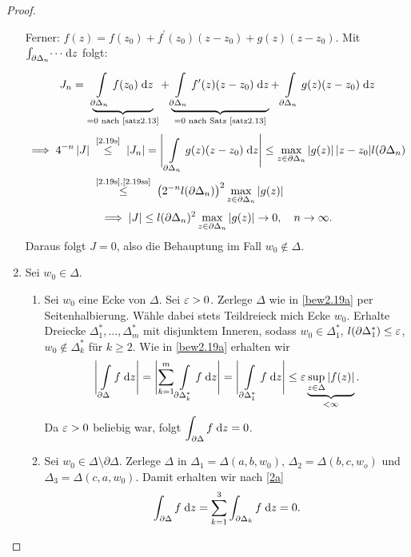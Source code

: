 \documentclass[a4paper,twoside,DIV15,BCOR12mm]{scrbook}
\begin{document}
\begin{proof}
\begin{enumerate}[label=(\arabic*),ref=(\arabic*)]
Ferner: $f(z)=f(z_0) + f^\prime(z_0)(z-z_0) + g(z)(z-z_0)$. Mit $\int_{\partial\Delta_n}^{}{\dotsi}\;\mathrm{d} z$ folgt:
\[ J_n = \underbrace{\int\limits_{\partial\Delta_n}^{}{f(z_0)}\;\mathrm{d}z}_{=0 \text{ nach \ref{satz2.13}}} +
\underbrace{\int\limits_{\partial\Delta_n}^{}{f^\prime(z)(z-z_0)}\;\mathrm{d}z}_{=0 \text{ nach Satz \ref{satz2.13}}} + \int\limits_{\partial\Delta_n}^{}{g(z)(z-z_0)}\;\mathrm{d}z \]
\begin{align*}
  \folgt 4^{-n}\abs{J} &\nach{\le}{\eqref{2.19s}} \abs{J_n} = \Biggl\lvert\,\Integral{\partial\Delta_n}{}{g(z)(z-z_0)}{z}\Biggr\rvert \le
  \max_{z\in\partial\Delta_n}{\abs{g(z)}\abs{z-z_0}}l(\partial\Delta_n) \\
  &\nach{\le}{\eqref{2.19s},\eqref{2.19ss}} \left(2^{-n}l(\partial\Delta_n)\right)^2 \max_{z\in\partial\Delta_n}{\abs{g(z)}}
\end{align*}
\[ \implies \left\lvert J\right\lvert \le l(\partial\Delta_n)^2 \max_{z\in\partial\Delta_n}{\left\lvert g(z)\right\lvert} \to 0, \quad n\rightarrow\infty. \]
Daraus folgt $J=0$, also die Behauptung im Fall $w_0\notin\Delta$.
\item Sei $w_0\in\Delta$.
  \begin{enumerate}[label=(\alph*),ref=(\alph*)]
  \item \label{2a} Sei $w_0$ eine Ecke von $\Delta$. Sei $\varepsilon>0$. Zerlege $\Delta$ wie in \ref{bew2.19a} per Seitenhalbierung. Wähle dabei
    stets Teildreieck mich Ecke $w_0$. Erhalte Dreiecke $\Delta_1^*,\dotsc,\Delta_m^*$ mit disjunktem Inneren, sodass
    $w_0\in\Delta_1^*$, $l(\partial\Delta_1^*)\le\varepsilon$, $w_0\notin\Delta_k^*$ für $k\ge2$. Wie in \ref{bew2.19a} erhalten
    wir \[\Biggl\lvert\,\int\limits_{\partial\Delta}^{}{f}\;\mathrm{d}z\Biggr\rvert = \Biggl\lvert\sum_{k=1}^m{\int\limits_{\partial\Delta_k^*}^{}{f}\;\mathrm{d}z}\Biggr\rvert =
    \Biggl\lvert\,\int\limits_{\partial\Delta_1^*}^{}{f}\;\mathrm{d}z\Biggr\rvert \le \varepsilon \underbrace{\sup_{z\in\Delta}{\left\lvert f(z)\right\lvert}}_{<\infty}. \]
    Da $\varepsilon>0$ beliebig war, folgt $\displaystyle\int_{\partial\Delta}^{}{f}\;\mathrm{d} z = 0$.
  \item \label{2b} Sei $w_0\in\Delta\setminus\partial\Delta$. Zerlege $\Delta$ in $\Delta_1=\Delta(a,b,w_0)$,
    $\Delta_2=\Delta(b,c,w_o)$
    und $\Delta_3=\Delta(c,a,w_0)$. Damit erhalten wir nach \ref{2a}
    \[ \int_{\partial\Delta}^{}{f}\;\mathrm{d} z = \sum_{k=1}^{3}{\int_{\partial\Delta_k}^{}{f}\;\mathrm{d} z} = 0. \]
    \begin{center}
\end{center}
\end{enumerate}
\end{enumerate}
\end{proof}
\end{document}
